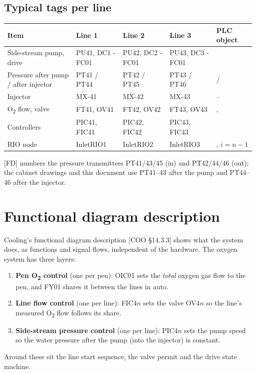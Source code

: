 \documentclass[11pt,a4paper]{article}
\newcommand{\Otwo}{O\textsubscript{2}}
\begin{document}
\subsection{Typical tags per line}
\begin{center}
\begin{small}
\begin{tabularx}{\textwidth}{@{}P{34mm}P{22mm}P{22mm}P{22mm}L@{}}
\toprule
Item & Line 1 & Line 2 & Line 3 & PLC object \\
\midrule
Side-stream pump, drive & PU41, DC1 -FC01 & PU42, DC2 -FC01 & PU43, DC3 -FC01 &  \\
Pressure after pump / after injector & PT41 / PT44 & PT42 / PT45 & PT43 / PT46 &  /  \\
Injector & MX-41 & MX-42 & MX-43 & -- \\
\Otwo{} flow, valve & FT41, OV41 & FT42, OV42 & FT43, OV43 & ,  \\
Controllers & PIC41, FIC41 & PIC42, FIC42 & PIC43, FIC43 &  \\
RIO node & InletRIO1 & InletRIO2 & InletRIO3 & , $i = n-1$ \\
\bottomrule
\end{tabularx}
\end{small}
\end{center}
[FD] numbers the pressure transmitters PT41/43/45 (in) and PT42/44/46 (out); the cabinet drawings
and this document use PT41--43 after the pump and PT44--46 after the injector.

\section{Functional diagram description}
\label{sec:func}

Cooling's functional diagram description [COO \S14.3.3] shows what the system does, as functions
and signal flows, independent of the hardware. The oxygen system has three layers:
\begin{enumerate}[nosep]
  \item \textbf{Pen \Otwo{} control} (one per pen): OIC01 sets the \emph{total} oxygen gas flow
        to the pen, and FY01 shares it between the lines in auto.
  \item \textbf{Line flow control} (one per line): FIC4$n$ sets the valve OV4$n$ so the line's
        measured \Otwo{} flow follows its share.
  \item \textbf{Side-stream pressure control} (one per line): PIC4$n$ sets the pump speed so the
        water pressure after the pump (into the injector) is constant.
\end{enumerate}
Around these sit the line start sequence, the valve permit and the drive state machine.
\end{document}
